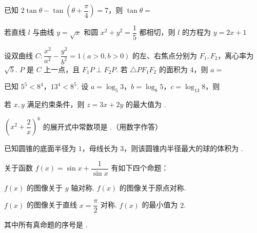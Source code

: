 \documentclass[a4paper,11pt]{report}
\begin{document}
\begin{examquestions}
\item 已知 $2\tan\theta-\tan\left(\theta+\dfrac{\pi}{4}\right)=7$，则 $\tan\theta=$

\item 若直线 $l$ 与曲线 $y=\sqrt{x}$ 和圆 $x^2+y^2=\dfrac15$ 都相切，则 $l$ 的方程为
\fourchoices
{$y=2x+1$}
{}
{}
{}

\item 设双曲线 $C:\dfrac{x^2}{a^2}-\dfrac{y^2}{b^2}=1(a>0,b>0)$ 的左、右焦点分别为 $F_1,F_2$，离心率为 $\sqrt5$. $P$ 是 $C$ 上一点，且 $F_1P\perp F_2P$. 若 $\triangle PF_1F_2$ 的面积为 $4$，则 $a=$

\item 已知 $5^5<8^4$，$13^4<8^5$. 设 $a=\log_5 3$，$b=\log_8 5$，$c=\log_{13}8$，则

\end{examquestions}

\begin{examquestions}[start=13]

\item 若 $x,y$ 满足约束条件，则 $z=3x+2y$ 的最大值为 \blank.

\item $\left(x^2+\dfrac2x\right)^6$ 的展开式中常数项是 \blank.（用数字作答）

\item 已知圆锥的底面半径为 $1$，母线长为 $3$，则该圆锥内半径最大的球的体积为 \blank.

\item 关于函数 $f(x)=\sin x+\dfrac{1}{\sin x}$ 有如下四个命题：

 $f(x)$ 的图像关于 $y$ 轴对称.  $f(x)$ 的图像关于原点对称. 

 $f(x)$ 的图像关于直线 $x=\dfrac{\pi}{2}$ 对称.  $f(x)$ 的最小值为 $2$. 

其中所有真命题的序号是 \blank.

\end{examquestions}
\end{document}
